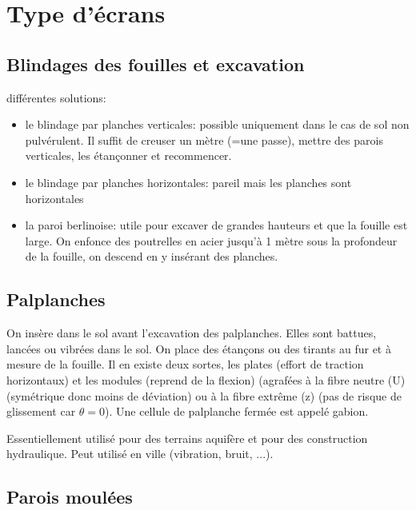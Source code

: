 \section{Type d'écrans}

\subsection{Blindages des fouilles et excavation}

différentes solutions:
\begin{itemize}
    \item le blindage par planches verticales: possible uniquement dans le cas de sol non pulvérulent. Il suffit de creuser un mètre (=une passe), mettre des parois verticales, les étançonner et recommencer.
    \item le blindage par planches horizontales: pareil mais les planches sont horizontales
    \item la paroi berlinoise: utile pour excaver de grandes hauteurs et que la fouille est large. On enfonce des poutrelles en acier jusqu'à 1 mètre sous la profondeur de la fouille, on descend en y insérant des planches.
\end{itemize}

\medskip

\subsection{Palplanches}

On insère dans le sol avant l'excavation des palplanches. Elles sont battues, lancées ou vibrées dans le sol. On place des étançons ou des tirants au fur et à mesure de la fouille. Il en existe deux sortes, les plates (effort de traction horizontaux) et les modules (reprend de la flexion) (agrafées à la fibre neutre (U) (symétrique donc moins de déviation) ou à la fibre extrême (z) (pas de risque de glissement car $\theta = 0$). Une cellule de palplanche fermée est appelé gabion.

Essentiellement utilisé pour des terrains aquifère et pour des construction hydraulique. Peut utilisé en ville (vibration, bruit, ...).

\subsection{Parois moulées}

